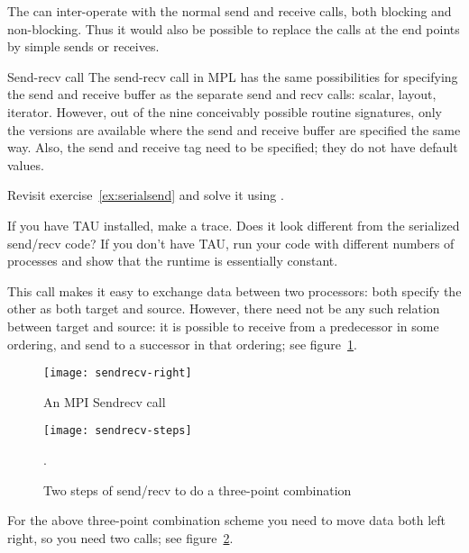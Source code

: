 \begin{remark}
  The  can inter-operate with
  the normal send and receive calls, both blocking and non-blocking.
  Thus it would also be possible to replace the 
  calls at the end points by simple sends or receives.
\end{remark}

\begin{mplnote}{Send-recv call}
  The send-recv call in \ac{MPL} has the same possibilities
  for specifying the send and receive buffer as the separate send and recv calls:
  scalar, layout, iterator. However, out of the nine conceivably possible
  routine signatures, only the versions are available where the send and receive buffer
  are specified the same way.
  Also, the send and receive tag need to be specified; they do not have default values.

\end{mplnote}

\begin{exercise}
  \label{ex:rightsendrecv}
  Revisit exercise~\ref{ex:serialsend} and solve it using
  .

  If you have TAU installed, make a trace. Does it look different
  from the serialized send/recv code? If you don't have TAU, run your
  code with different numbers of processes and show that the runtime
  is essentially constant.
\end{exercise}

This call makes it easy to exchange data between two processors: both
specify the other as both target and source. However, there need not
be any such relation between target and source: it is possible to
receive from a predecessor in some ordering, and send to a successor
in that ordering; see figure~\ref{fig:sendrecv}.

\begin{figure}[ht]
  \texttt{[image: sendrecv-right]}
  \caption{An MPI Sendrecv call}
  \label{fig:sendrecv}
\end{figure}

\begin{figure}[ht]
  \texttt{[image: sendrecv-steps]}
  \caption{Two steps of send/recv to do a three-point combination}
  \label{fig:sendrecv-steps}.
\end{figure}

For the above three-point combination scheme you need to move data
both left right, so you need two  calls;
see figure~\ref{fig:sendrecv-steps}.

